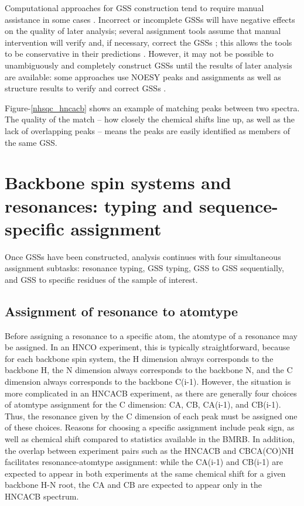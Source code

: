 Computational approaches for GSS construction tend to require manual 
assistance in some cases \cite{autoassign1997, mars}.  Incorrect or 
incomplete GSSs will have negative effects on the quality of later 
analysis; several assignment tools assume that manual intervention will 
verify and, if necessary, correct the GSSs \cite{williamson2009automated}; 
this allows the tools to be conservative in their 
predictions \cite{autoassign1997}.  However, it may not be 
possible to unambiguously and completely construct GSSs until the results 
of later analysis are available: some approaches use NOESY peaks and 
assignments as well as structure results to verify and correct GSSs 
\cite{autoassign1997}.

Figure-\ref{nhsqc_hncacb} shows an example of matching peaks between two
spectra.  The quality of the match -- how closely the chemical shifts line up,
as well as the lack of overlapping peaks -- means the peaks are easily
identified as members of the same GSS.


\section{Backbone spin systems and resonances: typing and sequence-specific assignment}

Once GSSs have been constructed, analysis continues with four simultaneous 
assignment subtasks: resonance typing, GSS typing, GSS to
GSS sequentially, and GSS to specific residues of the sample of interest.

\subsection{Assignment of resonance to atomtype}

Before assigning a resonance to a specific 
atom, the atomtype of a resonance may be assigned.  In an HNCO experiment, 
this is typically straightforward, because for each backbone spin system, 
the H dimension always corresponds to the backbone H, the N dimension always 
corresponds to the backbone N, and the C dimension always corresponds to the 
backbone C(i-1).  However, the situation is more complicated in an HNCACB 
experiment, as there are generally four choices of atomtype assignment for 
the C dimension:  CA, CB, CA(i-1), and CB(i-1).  Thus, the resonance given 
by the C dimension of each peak must be assigned one of these choices.  
Reasons for choosing a specific assignment include peak sign, as well as 
chemical shift compared to statistics available in the BMRB.  In addition, 
the overlap between experiment pairs such as the HNCACB and CBCA(CO)NH 
facilitates resonance-atomtype assignment: while the CA(i-1) and CB(i-1) 
are expected to appear in both experiments at the same chemical shift for 
a given backbone H-N root, the CA and CB are expected to appear only in the 
HNCACB spectrum.

